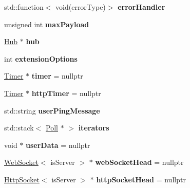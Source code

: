 \begin{DoxyCompactItemize}
\mbox{\label{structu_w_s_1_1_group_a4a639b72d351d68946652f6af1878135}} 
std\+::function$<$ void(error\+Type)$>$ {\bfseries error\+Handler}
\item 
\mbox{\label{structu_w_s_1_1_group_a5dcef3abf644403b9c1dc3a0453e2d83}} 
unsigned int {\bfseries max\+Payload}
\item 
\mbox{\label{structu_w_s_1_1_group_af6aa8250105526d91faebaa0b0b5fdcf}} 
\mbox{\hyperlink{structu_w_s_1_1_hub}{Hub}} $\ast$ {\bfseries hub}
\item 
\mbox{\label{structu_w_s_1_1_group_ae52736f5273cb5be178888f756077caa}} 
int {\bfseries extension\+Options}
\item 
\mbox{\label{structu_w_s_1_1_group_a6a2a314763b0ec9537260b0a5472f8b5}} 
\mbox{\hyperlink{struct_timer}{Timer}} $\ast$ {\bfseries timer} = nullptr
\item 
\mbox{\label{structu_w_s_1_1_group_a2c263b7ee199bb19fafb4ea46ed57cd6}} 
\mbox{\hyperlink{struct_timer}{Timer}} $\ast$ {\bfseries http\+Timer} = nullptr
\item 
\mbox{\label{structu_w_s_1_1_group_a853b9f3f8cecebb3c8b2b65ef68c290c}} 
std\+::string {\bfseries user\+Ping\+Message}
\item 
\mbox{\label{structu_w_s_1_1_group_ae1f3f3edf17c8fbea2dbec2a2bb3b16a}} 
std\+::stack$<$ \mbox{\hyperlink{struct_poll}{Poll}} $\ast$ $>$ {\bfseries iterators}
\item 
\mbox{\label{structu_w_s_1_1_group_af65a2e9b48ccaab0350a3b4deb428762}} 
void $\ast$ {\bfseries user\+Data} = nullptr
\item 
\mbox{\label{structu_w_s_1_1_group_a206ce7abbc04b228eb51c2a63c54d21b}} 
\mbox{\hyperlink{structu_w_s_1_1_web_socket}{Web\+Socket}}$<$ is\+Server $>$ $\ast$ {\bfseries web\+Socket\+Head} = nullptr
\item 
\mbox{\label{structu_w_s_1_1_group_a79744bc38eec51aa1860d59f2fd50db8}} 
\mbox{\hyperlink{structu_w_s_1_1_http_socket}{Http\+Socket}}$<$ is\+Server $>$ $\ast$ {\bfseries http\+Socket\+Head} = nullptr
\end{DoxyCompactItemize}
